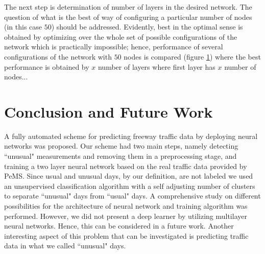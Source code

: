 \documentclass[twocolumn,10pt]{asme2e}
\begin{document}
The next step is determination of number of layers in the desired network. The question of what is the best of way of configuring a particular number of nodes (in this case $50$) should be addressed. Evidently, best in the optimal sense is obtained by optimizing over the whole set of possible configurations of the network which is practically impossible; hence, performance of several configurations of the network with $50$ nodes is compared (figure \ref{}) where the best performance is obtained by $x$ number of layers where first layer has $x$ number of nodes...

 
\section{Conclusion and Future Work}
A fully automated scheme for predicting freeway traffic data by deploying neural networks was proposed. 
Our scheme had two main steps, namely detecting ``unusual" measurements and removing them in a preprocessing stage, and training a two layer neural network based on the real traffic data provided by PeMS.
Since usual and unusual days, by our definition, are not labeled we used an unsupervised classification algorithm with a self adjusting number of clusters to separate ``unusual" days from ``usual" days. A comprehensive study on  different possibilities for the architecture of neural network and training algorithm was performed. However, we did not present a deep learner by utilizing multilayer neural networks. Hence, this can be considered in a future work. Another interesting aspect of this problem that can be investigated is predicting traffic data in what we called ``unusual" days.




\
\end{document}
